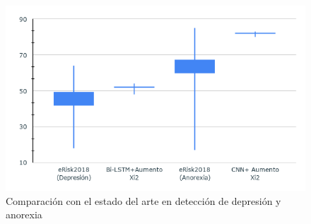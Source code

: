 \begin{figure}[!ht]
    \centering
  \includegraphics[scale=0.9]{sections/figures/sticks-state.png}
    \caption{Comparación con el estado del arte en detección de depresión y anorexia}
    \label{fig:state_of_art}
\end{figure}